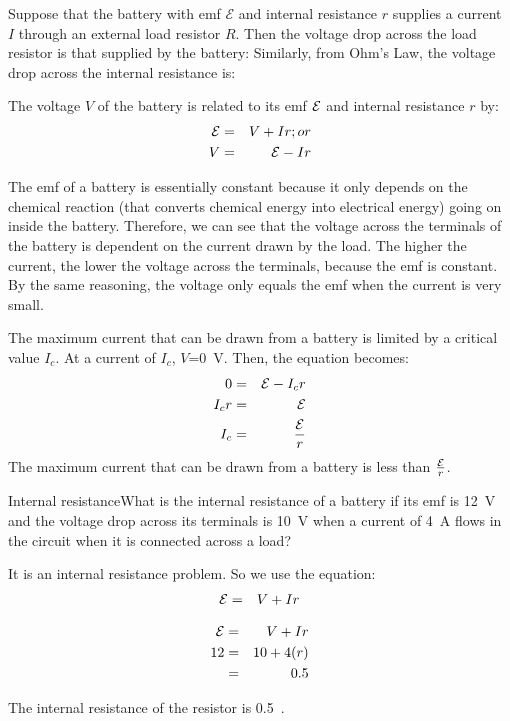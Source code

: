 
Suppose that the battery with emf $\mathcal{E}$ and internal resistance $r$ supplies a current $I$ through an external load resistor $R$. Then the voltage drop across the load resistor is that supplied by the battery:
Similarly, from Ohm's Law, the voltage drop across the internal resistance is:

The voltage $V$ of the battery is related to its emf ${\cal E}$ and internal resistance $r$ by:
\begin{eqnarray*}
{\cal E} &=& V + I r ;or\\
V&=& {\cal E} - I r
\end{eqnarray*}

The emf of a battery is essentially constant because it only depends on the chemical reaction (that converts chemical energy into electrical energy) going on inside the battery. Therefore, we can see that the voltage across the terminals of the battery is dependent on the current drawn by the load. The higher the current, the lower the voltage across the terminals, because the emf is constant. By the same reasoning, the voltage only equals the emf when the current is very small.

The maximum current that can be drawn from a battery is limited by a critical value $I_c$. At a current of $I_c$, $V$=0~V. Then, the equation becomes:
\begin{eqnarray*}
0 &=& {\cal E} - I_c r\\
I_c r &=& {\cal E}\\
I_c&=&\frac{{\cal E}}{r}
\end{eqnarray*}
The maximum current that can be drawn from a battery is less than $\frac{{\cal E}}{r}$.


\begin{wex}{Internal resistance}{What is the internal resistance of a battery if its emf is 12~V and the voltage drop across its terminals is 10~V when a current of 4~A flows in the circuit when it is connected across a load?}{
It is an internal resistance problem. So we use the equation:
\begin{eqnarray*}
{\cal E} &=& V + I r
\end{eqnarray*}

\begin{eqnarray*}
{\cal E} &=& V + I r\\
12&=&10 + 4(r)\\
&=&0.5
\end{eqnarray*}

The internal resistance of the resistor is 0.5~\ohm.}
\end{wex}

